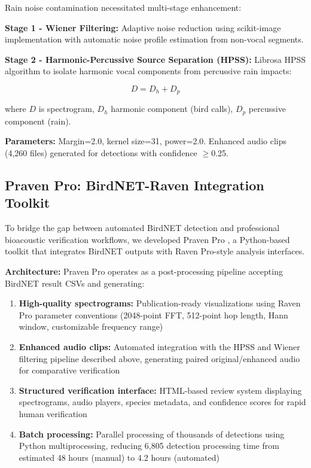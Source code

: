\documentclass[twocolumn]{article}
\begin{document}
Rain noise contamination necessitated multi-stage enhancement:

\textbf{Stage 1 - Wiener Filtering:} Adaptive noise reduction using scikit-image implementation with automatic noise profile estimation from non-vocal segments.

\textbf{Stage 2 - Harmonic-Percussive Source Separation (HPSS):} Librosa HPSS algorithm \citep{Fitzgerald2010} to isolate harmonic vocal components from percussive rain impacts:

\begin{equation}
D = D_h + D_p
\end{equation}

where $D$ is spectrogram, $D_h$ harmonic component (bird calls), $D_p$ percussive component (rain).

\textbf{Parameters:} Margin=2.0, kernel size=31, power=2.0. Enhanced audio clips (4,260 files) generated for detections with confidence $\geq$0.25.

\subsection{Praven Pro: BirdNET-Raven Integration Toolkit}

To bridge the gap between automated BirdNET detection and professional bioacoustic verification workflows, we developed Praven Pro \citep{Redpath2025}, a Python-based toolkit that integrates BirdNET outputs with Raven Pro-style analysis interfaces.

\textbf{Architecture:} Praven Pro operates as a post-processing pipeline accepting BirdNET result CSVs and generating:

\begin{enumerate}
\item \textbf{High-quality spectrograms:} Publication-ready visualizations using Raven Pro parameter conventions (2048-point FFT, 512-point hop length, Hann window, customizable frequency range)

\item \textbf{Enhanced audio clips:} Automated integration with the HPSS and Wiener filtering pipeline described above, generating paired original/enhanced audio for comparative verification

\item \textbf{Structured verification interface:} HTML-based review system displaying spectrograms, audio players, species metadata, and confidence scores for rapid human verification

\item \textbf{Batch processing:} Parallel processing of thousands of detections using Python multiprocessing, reducing 6,805 detection processing time from estimated 48 hours (manual) to 4.2 hours (automated)
\end{enumerate}
\end{document}
